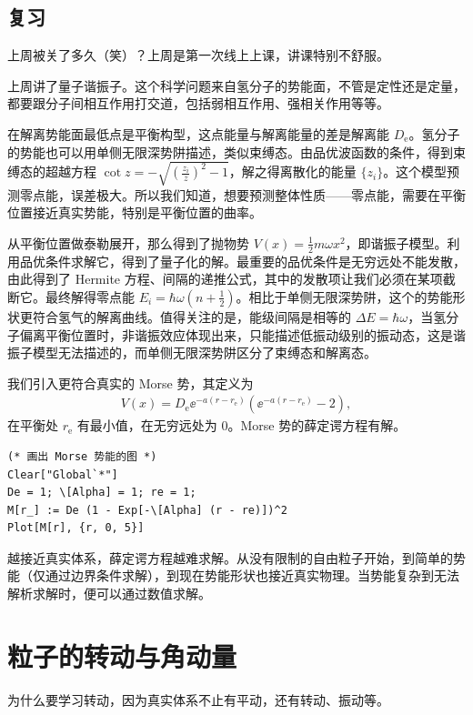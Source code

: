 \section{复习}
上周被关了多久（笑）？上周是第一次线上上课，讲课特别不舒服。

上周讲了量子谐振子。这个科学问题来自氢分子的势能面，不管是定性还是定量，都要跟分子间相互作用打交道，包括弱相互作用、强相关作用等等。

在解离势能面最低点是平衡构型，这点能量与解离能量的差是解离能 $D_{\mathrm e}$。氢分子的势能也可以用单侧无限深势阱描述，类似束缚态。由品优波函数的条件，得到束缚态的超越方程 $\cot z = - \sqrt{\left(\frac{z_i}z\right)^2 - 1}$，解之得离散化的能量 $\{z_i\}$。这个模型预测零点能，误差极大。所以我们知道，想要预测整体性质——零点能，需要在平衡位置接近真实势能，特别是平衡位置的曲率。

从平衡位置做泰勒展开，那么得到了抛物势 $V(x) = \frac12 m \omega x^2$，即谐振子模型。利用品优条件求解它，得到了量子化的解。最重要的品优条件是无穷远处不能发散，由此得到了 Hermite 方程、间隔的递推公式，其中的发散项让我们必须在某项截断它。最终解得零点能 $E_i = \hbar\omega\left(n + \frac12\right)$。相比于单侧无限深势阱，这个的势能形状更符合氢气的解离曲线。值得关注的是，能级间隔是相等的 $\Delta E = \hbar\omega$，当氢分子偏离平衡位置时，非谐振效应体现出来，只能描述低振动级别的振动态，这是谐振子模型无法描述的，而单侧无限深势阱区分了束缚态和解离态。

我们引入更符合真实的 Morse 势，其定义为
\begin{eqnarray}
    V(x) = D_{\mathrm e} \ee^{-a (r-r_\mathrm e)} ( \ee^{-a (r - r_\mathrm e)} - 2),
\end{eqnarray}
在平衡处 $r_\mathrm e$ 有最小值，在无穷远处为 0。Morse 势的薛定谔方程有解。
\begin{lstlisting}
(* 画出 Morse 势能的图 *)
Clear["Global`*"]
De = 1; \[Alpha] = 1; re = 1;
M[r_] := De (1 - Exp[-\[Alpha] (r - re)])^2
Plot[M[r], {r, 0, 5}]
\end{lstlisting}
越接近真实体系，薛定谔方程越难求解。从没有限制的自由粒子开始，到简单的势能（仅通过边界条件求解），到现在势能形状也接近真实物理。当势能复杂到无法解析求解时，便可以通过数值求解。

\chapter{粒子的转动与角动量}
为什么要学习转动，因为真实体系不止有平动，还有转动、振动等。

